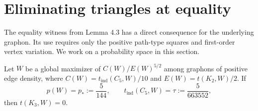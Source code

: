 \section{Eliminating triangles at equality}
\label{sec:triangles}

The equality witness from Lemma 4.3 has a direct consequence for the
underlying graphon. Its use requires only the positive path-type squares and
first-order vertex variation. We work on a probability space in this section.

\begin{proposition}\label{prop:triangle-elimination}
Let $W$ be a global maximizer of $C(W)/E(W)^{5/2}$ among
graphons of positive edge density, where $C(W)=t_{\mathrm{ind}}(C_5,W)/10$
and $E(W)=t(K_2,W)/2$. If
\[
 p(W)=p_\ast:=\frac5{144},\qquad
 t_{\mathrm{ind}}(C_5,W)=\tau:=\frac5{663552},
\]
then $t(K_3,W)=0$.
\end{proposition}

